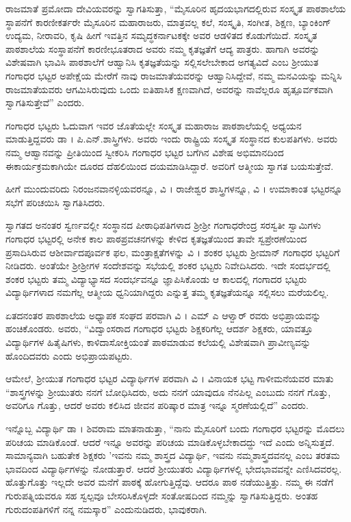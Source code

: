 {ರಾಜಮಾತೆ ಪ್ರಮೋದಾ ದೇವಿಯವರನ್ನು ಸ್ವಾಗತಿಸುತ್ತಾ, “ಮೈಸೂರಿನ ಹೃದಯ\-ಭಾಗದಲ್ಲಿರುವ ಸಂಸ್ಕೃತ ಪಾಠಶಾಲೆಯ ಸ್ಥಾಪನೆಗೆ ಕಾರಣೀಕರ್ತರೇ ಮೈಸೂರಿನ ಮಹಾರಾಜರು, ಮಾತ್ರವಲ್ಲ ಕಲೆ, ಸಂಸ್ಕೃತಿ, ಸಂಗೀತ, ಶಿಕ್ಷಣ, ಬ್ಯಾಂಕಿಂಗ್ ಉದ್ಯಮ, ನೀರಾವರಿ, ಕೃಷಿ ಹೀಗೆ ಇವತ್ತಿನ ಸಮೃದ್ಧಕರ್ನಾಟಕಕ್ಕೇ ಅವರ ಆಡಳಿತದ ಕೊಡುಗೆ\-ಯಿದೆ. ಸಂಸ್ಕೃತ ಪಾಠಶಾಲೆಯ ಸಂಸ್ಥಾಪನೆಗೆ ಕಾರಣೀಭೂತರಾದ ಅವರು ನಮ್ಮ ಕೃತಜ್ಞತೆಗೆ ಆದ್ಯ ಪಾತ್ರರು.  ಹಾಗಾಗಿ ಅವರನ್ನು ವಿಶೇಷವಾಗಿ ಭಾವಿಸಿ ಪಾಠಶಾಲೆಗೆ ಆಹ್ವಾನಿಸಿ ಕೃತಜ್ಞತೆಯನ್ನು ಸಲ್ಲಿಸಲೇಬೇಕಾದ ಅಗತ್ಯವಿದೆ ಎಂಬ ಶ್ರೀಯುತ ಗಂಗಾಧರ ಭಟ್ಟರ ಅಪೇಕ್ಷೆಯ ಮೇರೆಗೆ ನಾವು ರಾಜಮಾತೆಯವರನ್ನು ಆಹ್ವಾನಿಸಿದ್ದೇವೆ, ನಮ್ಮ ಮನವಿಯನ್ನು ಮನ್ನಿಸಿ ರಾಜಮಾತೆಯವರು ಆಗಮಿಸಿರುವುದು ಒಂದು ಐತಿಹಾಸಿಕ \hbox{ಕ್ಷಣವಾಗಿದೆ,} ಅವರನ್ನು ನಾವೆಲ್ಲರೂ ಹೃತ್ಪೂರ್ವಕವಾಗಿ ಸ್ವಾಗತಿಸುತ್ತೇವೆ” ಎಂದರು.

ಗಂಗಾಧರ ಭಟ್ಟರು ಓದುವಾಗ ಇವರ ಜೊತೆಯಲ್ಲೇ ಸಂಸ್ಕೃತ ಮಹಾರಾಜ ಪಾಠಶಾಲೆಯಲ್ಲಿ ಅಧ್ಯಯನ ಮಾಡುತ್ತಿದ್ದವರು ಡಾ । ಪಿ.ಎನ್.ಶಾಸ್ತ್ರಿಗಳು. ಅವರು ಇಂದು ರಾಷ್ಟ್ರಿಯ ಸಂಸ್ಕೃತ ಸಂಸ್ಥಾನದ ಕುಲಪತಿಗಳು. ಅವರು ನಮ್ಮ ಆಹ್ವಾನವನ್ನು ಪ್ರೀತಿಯಿಂದ ಸ್ವೀಕರಿಸಿ ಗಂಗಾಧರ ಭಟ್ಟರ ಬಗೆಗಿನ ವಿಶೇಷ ಅಭಿಮಾನದಿಂದ ಈ\break ಕಾರ್ಯಕ್ರಮಕಾಗಿಯೇ ದೂರದ ದೆಹಲಿಯಿಂದ ದಯಮಾಡಿಸಿದ್ದಾರೆ. ಅವರಿಗೆ ಆತ್ಮೀಯ ಸ್ವಾಗತ ಬಯಸುತ್ತೇವೆ.

ಹೀಗೆ ಮುಂದುವರಿದು ನಿರಂಜನವಾನಳ್ಳಿಯವರನ್ನೂ, ವಿ । ರಾಜೇಶ್ವರ ಶಾಸ್ತ್ರಿ\-ಗಳನ್ನೂ, ವಿ । ಉಮಾಕಾಂತ ಭಟ್ಟರನ್ನೂ ಸಭೆಗೆ ಪರಿಚಯಿಸಿ ಸ್ವಾಗತಿಸಿದರು.

ಸ್ವಾಗತದ  ಅನಂತರ ಸ್ವರ್ಣವಲ್ಲೀ ಸಂಸ್ಥಾನದ ಪೀಠಾಧಿಪತಿಗಳಾದ ಶ್ರೀಶ್ರೀ ಗಂಗಾಧರೇಂದ್ರ ಸರಸ್ವತೀ ಸ್ವಾಮಿಗಳು  ಗಂಗಾಧರ ಭಟ್ಟರಲ್ಲಿ ಅನೇಕ ಕಾಲ ಪಾಠ\-ಪ್ರವಚನಗಳನ್ನು ಕೇಳಿದ ಕೃತಜ್ಞತೆಯಿಂದ ತಾವೇ ಸ್ವಪ್ರೇರಣೆಯಿಂದ ಪ್ರಸಾದಿಸಿರುವ ಆಶೀರ್ವಾದಪೂರ್ವಕ ಫಲ, ಮಂತ್ರಾಕ್ಷತೆಗಳನ್ನು ವಿ । ಶಂಕರ ಭಟ್ಟರು ಶ್ರೀಮಾನ್ ಗಂಗಾಧರ ಭಟ್ಟರಿಗೆ ನೀಡಿದರು. ಅಂತೆಯೇ ಶ್ರೀಶ್ರೀಗಳ ಸಂದೇಶವನ್ನು ಸಭೆಯಲ್ಲಿ ಶಂಕರ ಭಟ್ಟರು ನಿವೇದಿಸಿದರು. 
ಇದೇ ಸಂದರ್ಭದಲ್ಲಿ ಶಂಕರ ಭಟ್ಟರು ತಮ್ಮ ವಿದ್ಯಾಭ್ಯಾಸದ ಸಂದರ್ಭವನ್ನೂ ಜ್ಞಾಪಿಸಿಕೊಂಡು ಆ ಕಾಲದಲ್ಲಿ ಗಂಗಾದರ ಭಟ್ಟರು ವಿದ್ಯಾರ್ಥಿಗಳಾದ ನಮಗೆಲ್ಲ ಆತ್ಮೀಯ ಧ್ವನಿಯಾಗಿದ್ದರು ಎನ್ನುತ್ತ ತಮ್ಮ ಕೃತಜ್ಞತೆಯನ್ನೂ ಸಲ್ಲಿಸಲು ಮರೆಯಲಿಲ್ಲ.

ಏತದನಂತರ ಪಾಠಶಾಲೆಯ ಅಧ್ಯಾಪಕ ಸಂಘದ ಪರವಾಗಿ ವಿ । ಎಮ್ ಎ ಆಳ್ವಾರ್ ರವರು ಅಭಿಪ್ರಾಯವನ್ನು ಹಂಚಿಕೊಂಡರು. ಅವರು, “ವಿದ್ವಾಂಸರಾದ ಗಂಗಾಧರ ಭಟ್ಟರು ಶಿಕ್ಷಕರಿಗೆಲ್ಲ ಆದರ್ಶ ಶಿಕ್ಷಕರು, ಯಾವತ್ತೂ ವಿದ್ಯಾರ್ಥಿಗಳ ಹಿತೈಷಿಗಳು, ಕಾಳಿದಾಸೋಕ್ತಿಯಂತೆ ಪಾಠಮಾಡುವ ಕಲೆಯಲ್ಲಿ ವಿಶೇಷವಾಗಿ ಪ್ರಾವೀಣ್ಯವನ್ನು ಹೊಂದಿದವರು ಎಂದು ಅಭಿಪ್ರಾಯಪಟ್ಟರು.

ಆಮೇಲೆ, ಶ್ರೀಯುತ ಗಂಗಾಧರ ಭಟ್ಟರ ವಿದ್ಯಾರ್ಥಿಗಳ ಪರವಾಗಿ ವಿ । ವಿನಾಯಕ ಭಟ್ಟ ಗಾಳೀಮನೆಯವರ ಮಾತು \enginline{-} “ಶಾಸ್ತ್ರಗಳನ್ನು ಶ್ರೀಯುತರು ನನಗೆ ಬೋಧಿ\-ಸಿದರು, ಅದು ನನಗೆ ಯಾವುದೂ ನೆನಪಿಲ್ಲ ಎಂಬುದು ನನಗೆ ಗೊತ್ತು, ಅವರಿಗೂ ಗೊತ್ತು, ಆದರೆ ಅವರು ಕಲಿಸಿದ ಜೀವನ ಪರಿಷ್ಕಾರ ಮಾತ್ರ ಇನ್ನೂ ಸ್ಮರಣೆಯಲ್ಲಿದೆ” ಎಂದರು. 

ಇನ್ನೊಬ್ಬ ವಿದ್ಯಾರ್ಥಿ ಡಾ । ಶಿವರಾಮ ಮಾತನಾಡುತ್ತಾ, “ನಾನು ಮೈಸೂರಿಗೆ ಬಂದು ಗಂಗಾಧರ ಭಟ್ಟರನ್ನು ಮೊದಲು ಪರಿಚಯ ಮಾಡಿಕೊಂಡೆ. ಆದರೆ ಇನ್ನೂ ಅವರನ್ನು ಪರಿಚಯ ಮಾಡಿಕೊಳ್ಳಬೇಕಾದದ್ದು ಇದೆ ಎಂದು ಅನ್ನಿಸುತ್ತದೆ. ಸಾಮಾನ್ಯ\-ವಾಗಿ ಬಹುತೇಕ ಶಿಕ್ಷಕರು ’ಇವನು ನಮ್ಮ ಶಾಸ್ತ್ರದ ವಿದ್ಯಾರ್ಥಿ, ಇವನು ನಮ್ಮ\-ಶಾಸ್ತ್ರದವನಲ್ಲ ಎಂಬ ತರತಮ ಭಾವದಿಂದ ವಿದ್ಯಾರ್ಥಿಗಳನ್ನು ನೋಡುತ್ತಾರೆ. ಆದರೆ ಶ್ರೀಯುತರು ವಿದ್ಯಾರ್ಥಿಗಳಲ್ಲಿ ಭೇದಭಾವವನ್ನೇ ಎಣಿಸಿದವರಲ್ಲ. ಹೊತ್ತುಗೊತ್ತು ಇಲ್ಲದೇ ಅವರ ಮನೆಗೆ ಪಾಠಕ್ಕೆ ಹೋಗುತ್ತಿದ್ದೆವು. ಆದರೂ ಪಾಠ ನಡೆಯುತ್ತಿತ್ತು. ನಮ್ಮ ಈ ನಡೆಗೆ ಗುರುಪತ್ನಿಯವರೂ ಸಹ ಸ್ವಲ್ಪವೂ ಬೇಸರಿಸಿಕೊಳ್ಳದೇ ಸಂತೋಷದಿಂದ ನಮ್ಮನ್ನು ಸ್ವಾಗತಿಸುತ್ತಿದ್ದರು. ಅಂತಹ ಗುರುದಂಪತಿಗಳಿಗೆ ನನ್ನ ನಮಸ್ಕಾರ” ಎಂದು\break ನುಡಿದರು, ಭಾವುಕರಾಗಿ.

}
